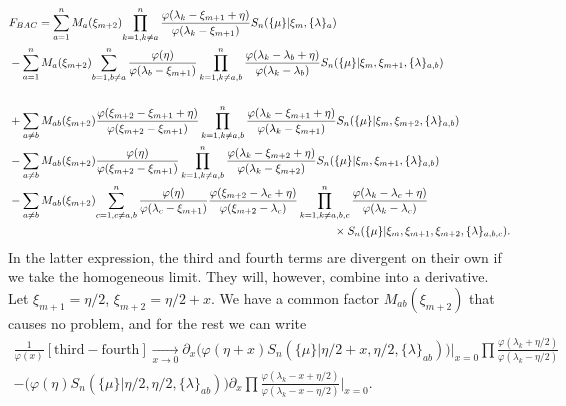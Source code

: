 \documentclass[a4paper,10pt]{article}
\begin{document}
\begin{equation}
\begin{aligned}
&F_{ B  {\color{black}{ A }} {\color{black}{C}} } = {\color{black}{ \sum_{a=1}^n M_a(\xi_{m+2}) }}
{\color{black}{ \prod_{k=1,k\neq a}^{n}
%
\frac{\varphi(\lambda_k-\xi_{m+1}+\eta)}{\varphi(\lambda_k-\xi_{m+1})}
 }} S_n(\{\mu\}|\xi_{m},\{\lambda\}_{a})\\
%
&  -  {\color{black}{ \sum_{a=1}^n M_a(\xi_{m+2}) }} {\color{black}{\sum_{b=1,b\neq a}^{n} \frac{\varphi(\eta)}{\varphi(\lambda_b-\xi_{m+1})} \prod_{k=1,k\neq a,b}^{n} \frac{\varphi(\lambda_k-\lambda_b+\eta)}{\varphi(\lambda_k-\lambda_b)}  }}S_n(\{\mu\}|\xi_{m},\xi_{m+1},\{\lambda\}_{a,b})\\
\\
%
&+ {\color{black}{ \sum_{a\neq b} M_{ab}(\xi_{m+2})  }}
{\color{black}{
\frac{\varphi(\xi_{m+2}-\xi_{m+1}+\eta)}{\varphi(\xi_{m+2}-\xi_{m+1})}
\prod_{k=1,k\neq a,b}^{n} 
\frac{\varphi(\lambda_k-\xi_{m+1}+\eta)}{\varphi(\lambda_k-\xi_{m+1})}
}}
S_n(\{\mu\}|\xi_{m},\xi_{m+2},\{\lambda\}_{a,b})\\
%
& -{\color{black}{ \sum_{a\neq b} M_{ab}(\xi_{m+2})  }} {\color{black}{ \frac{\varphi(\eta)}{\varphi(\xi_{m+2}-\xi_{m+1})} \prod_{k=1,k\neq a,b}^{n} \frac{\varphi(\lambda_k-\xi_{m+2}+\eta)}{\varphi(\lambda_k-\xi_{m+2})} }} 
S_n(\{\mu\}|\xi_{m},\xi_{m+1},\{\lambda\}_{a,b})\\
%
& -{\color{black}{ \sum_{a\neq b} M_{ab}(\xi_{m+2})  }} {\color{black}{\sum_{c=1,c\neq a,b}^{n} \frac{\varphi(\eta)}{\varphi(\lambda_c-\xi_{m+1})} \frac{\varphi(\xi_{m+2}-\lambda_c+\eta)}{\varphi(\xi_{m+2}-\lambda_c)} 
\prod_{k=1,k\neq a,b,c}^{n} \frac{\varphi(\lambda_k-\lambda_c+\eta)}{\varphi(\lambda_k-\lambda_c)} }}  \\
& \hspace*{10cm}
\times
S_n(\{\mu\}|\xi_{m},\xi_{m+1},\xi_{m+2},\{\lambda\}_{a,b,c}).\\
%
\end{aligned}
\end{equation}
In the latter expression, the third and fourth terms are divergent on their own if we take the homogeneous limit. They will, however, combine into a derivative. Let $\xi_{m+1}=\eta/2$, $\xi_{m+2}=\eta/2+x$. We have a common factor $M_{ab}(\xi_{m+2})$ that causes no problem, and for the rest we can write %
\begin{multline}
\frac{1}{\varphi(x)} \left[\text{third} - \text{fourth} \right] \xrightarrow[x\to0]{} \partial_x \Big(\varphi(\eta +x)S_n(\{\mu\}|\eta/2+x,\eta/2,\{\lambda\}_{ab})\Big)\Bigg|_{x=0}\prod\frac{\varphi(\lambda_k+\eta/2)}{\varphi(\lambda_k-\eta/2)} \\
- \Big(\varphi(\eta)S_n(\{\mu\}|\eta/2,\eta/2,\{\lambda\}_{ab})\Big) \partial_x\prod\frac{\varphi(\lambda_k-x+\eta/2)}{\varphi(\lambda_k-x-\eta/2)} \Bigg|_{x=0}.
\end{multline}
\end{document}
